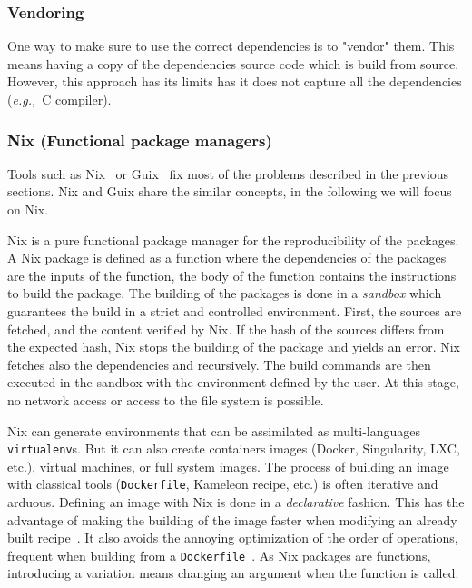 \documentclass[sigconf,natbib=false]{acmart}
\newcommand{\eg}{\emph{e.g.,}}
\begin{document}
\subsubsection{Vendoring}

One way to make sure to use the correct dependencies is to "vendor" them.
This means having a copy of the dependencies source code which is build from source.
However, this approach has its limits has it does not capture all the dependencies (\eg\ C compiler).

\subsubsection{Nix (Functional package managers)}

Tools such as Nix\ \cite{dolstra_nix_2004} or Guix\ \cite{courtes_functional_2013} fix most of the problems described in the previous sections.
Nix and Guix share the similar concepts, in the following we will focus on Nix.

Nix is a pure functional package manager for the reproducibility of the packages.
A Nix package is defined as a function where the dependencies of the packages are the inputs of the function, the body of the function contains the instructions to build the package.
The building of the packages is done in a \emph{sandbox} which guarantees the build in a strict and controlled environment.
First, the sources are fetched, and the content verified by Nix.
If the hash of the sources differs from the expected hash, Nix stops the building of the package and yields an error.
Nix fetches also the dependencies and recursively.
The build commands are then executed in the sandbox with the environment defined by the user.
At this stage, no network access or access to the file system is possible.


Nix can generate environments that can be assimilated as multi-languages \texttt{virtualenv}s.
But it can also create containers images (Docker, Singularity, LXC, etc.), virtual machines, or full system images.
The process of building an image with classical tools (\texttt{Dockerfile}, Kameleon recipe, etc.) is often iterative and arduous.
Defining an image with Nix is done in a \emph{declarative} fashion.
This has the advantage of making the building of the image faster when modifying an already built recipe\ \cite{nxc}.
It also avoids the annoying optimization of the order of operations, frequent when building from a \texttt{Dockerfile}\ \cite{docker_cache}. 
As Nix packages are functions, introducing a variation means changing an argument when the function is called.
\end{document}
